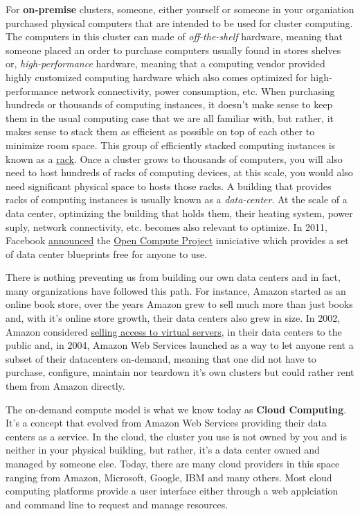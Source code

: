 \documentclass[]{book}
\theoremstyle{definition}
\theoremstyle{definition}
\theoremstyle{definition}
\theoremstyle{remark}
\begin{document}
For \textbf{on-premise} clusters, someone, either yourself or someone in
your organiation purchased physical computers that are intended to be
used for cluster computing. The computers in this cluster can made of
\emph{off-the-shelf} hardware, meaning that someone placed an order to
purchase computers usually found in stores shelves or,
\emph{high-performance} hardware, meaning that a computing vendor
provided highly customized computing hardware which also comes optimized
for high-performance network connectivity, power consumption, etc. When
purchasing hundreds or thousands of computing instances, it doesn't make
sense to keep them in the usual computing case that we are all familiar
with, but rather, it makes sense to stack them as efficient as possible
on top of each other to minimize room space. This group of efficiently
stacked computing instances is known as a
\href{https://en.wikipedia.org/wiki/Rack_unit}{rack}. Once a cluster
grows to thousands of computers, you will also need to host hundreds of
racks of computing devices, at this scale, you would also need
significant physical space to hosts those racks. A building that
provides racks of computing instances is usually known as a
\emph{data-center}. At the scale of a data center, optimizing the
building that holds them, their heating system, power suply, network
connectivity, etc. becomes also relevant to optimize. In 2011, Facebook
\href{https://code.facebook.com/posts/187637061409082/building-efficient-data-centers-with-the-open-compute-project/}{announced}
the \href{http://www.opencompute.org/}{Open Compute Project} inniciative
which provides a set of data center blueprints free for anyone to use.

There is nothing preventing us from building our own data centers and in
fact, many organizations have followed this path. For instance, Amazon
started as an online book store, over the years Amazon grew to sell much
more than just books and, with it's online store growth, their data
centers also grew in size. In 2002, Amazon considered
\href{https://en.wikipedia.org/wiki/Amazon_Web_Services\#History}{selling
access to virtual servers}, in their data centers to the public and, in
2004, Amazon Web Services launched as a way to let anyone rent a subset
of their datacenters on-demand, meaning that one did not have to
purchase, configure, maintain nor teardown it's own clusters but could
rather rent them from Amazon directly.

The on-demand compute model is what we know today as \textbf{Cloud
Computing}. It's a concept that evolved from Amazon Web Services
providing their data centers as a service. In the cloud, the cluster you
use is not owned by you and is neither in your physical building, but
rather, it's a data center owned and managed by someone else. Today,
there are many cloud providers in this space ranging from Amazon,
Microsoft, Google, IBM and many others. Most cloud computing platforms
provide a user interface either through a web applciation and command
line to request and manage resources.
\end{document}

